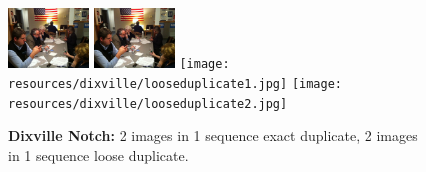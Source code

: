 \documentclass{acm_proc_article-sp}
\newcommand{\thumbheight}{16mm}
\newenvironment{thumbsequence}{}{\makebox[4mm]{}}
\begin{document}
\begin{figure}
\begin{centering}
	\begin{thumbsequence}
		\includegraphics[height=\thumbheight]{resources/dixville/exactduplicate1.jpg}
		\includegraphics[height=\thumbheight]{resources/dixville/exactduplicate2.jpg}
	\end{thumbsequence}
	\begin{thumbsequence}
		\texttt{[image: resources/dixville/looseduplicate1.jpg]}
		\texttt{[image: resources/dixville/looseduplicate2.jpg]}
	\end{thumbsequence}
	\caption{\textbf{Dixville Notch:} 2 images in 1 sequence exact duplicate, 2 images in 1 sequence loose duplicate.}
	\label{fig:dixville}
\end{centering}
\end{figure}
\end{document}
